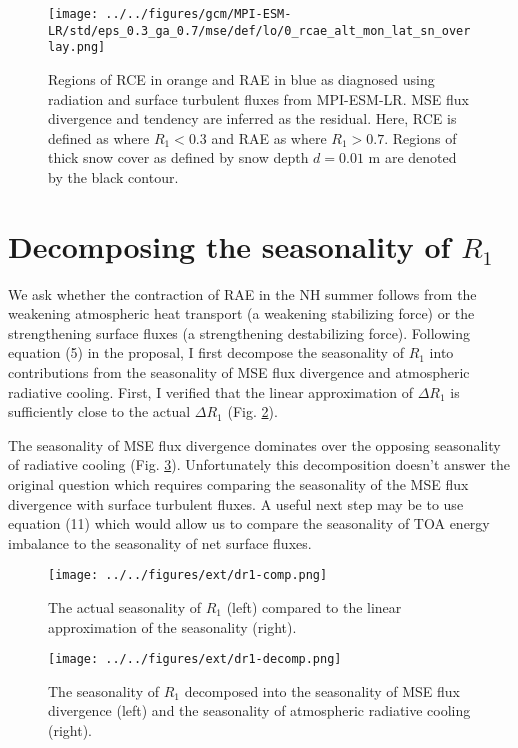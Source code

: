 \documentclass[11pt]{article}
\begin{document}
\begin{figure}[htbp]
\centering
\texttt{[image: ../../figures/gcm/MPI-ESM-LR/std/eps\_0.3\_ga\_0.7/mse/def/lo/0\_rcae\_alt\_mon\_lat\_sn\_overlay.png]}
\caption{\label{fig:orgae48b0a}Regions of RCE in orange and RAE in blue as diagnosed using radiation and surface turbulent fluxes from MPI-ESM-LR. MSE flux divergence and tendency are inferred as the residual. Here, RCE is defined as where \(R_1 < 0.3\) and RAE as where \(R_1 > 0.7\). Regions of thick snow cover as defined by snow depth \(d=0.01\) m are denoted by the black contour.}
\end{figure}

\section{Decomposing the seasonality of \(R_1\)}
\label{sec:org70614aa}
We ask whether the contraction of RAE in the NH summer follows from the weakening atmospheric heat transport (a weakening stabilizing force) or the strengthening surface fluxes (a strengthening destabilizing force). Following equation (5) in the proposal, I first decompose the seasonality of \(R_1\) into contributions from the seasonality of MSE flux divergence and atmospheric radiative cooling. First, I verified that the linear approximation of \(\Delta R_1\) is sufficiently close to the actual \(\Delta R_1\) (Fig. \ref{fig:org1573ac9}).

The seasonality of MSE flux divergence dominates over the opposing seasonality of radiative cooling (Fig. \ref{fig:org6023f92}). Unfortunately this decomposition doesn't answer the original question which requires comparing the seasonality of the MSE flux divergence with surface turbulent fluxes. A useful next step may be to use equation (11) which would allow us to compare the seasonality of TOA energy imbalance to the seasonality of net surface fluxes.

\begin{figure}[htbp]
\centering
\texttt{[image: ../../figures/ext/dr1-comp.png]}
\caption{\label{fig:org1573ac9}The actual seasonality of \(R_1\) (left) compared to the linear approximation of the seasonality (right).}
\end{figure}

\begin{figure}[htbp]
\centering
\texttt{[image: ../../figures/ext/dr1-decomp.png]}
\caption{\label{fig:org6023f92}The seasonality of \(R_1\) decomposed into the seasonality of MSE flux divergence (left) and the seasonality of atmospheric radiative cooling (right).}
\end{figure}
\end{document}
